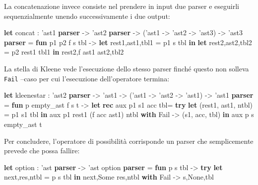 \documentclass[]{article}
\newenvironment{Shaded}{}{}
\newcommand{\DataTypeTok}[1]{\textcolor[rgb]{0.56,0.13,0.00}{#1}}
\newcommand{\KeywordTok}[1]{\textcolor[rgb]{0.00,0.44,0.13}{\textbf{#1}}}
\newcommand{\NormalTok}[1]{#1}
\begin{document}
La concatenazione invece consiste nel prendere in input due parser e
eseguirli sequenzialmente unendo successivamente i due output:

\begin{Shaded}
\begin{Highlighting}[]
\KeywordTok{let}\NormalTok{ concat : }
\NormalTok{'ast1 }\KeywordTok{parser}\NormalTok{ -> 'ast2 }\KeywordTok{parser}\NormalTok{ -> ('ast1 -> 'ast2 -> 'ast3) -> 'ast3 }\KeywordTok{parser}\NormalTok{ = }
\KeywordTok{fun}\NormalTok{ p1 p2 f s tbl ->}
  \KeywordTok{let}\NormalTok{ rest1,ast1,tbl1 = p1 s tbl }\KeywordTok{in}
  \KeywordTok{let}\NormalTok{ rest2,ast2,tbl2 = p2 rest1 tbl1 }\KeywordTok{in}
\NormalTok{  rest2,f ast1 ast2,tbl2}
\end{Highlighting}
\end{Shaded}

La stella di Kleene vede l'esecuzione dello stesso parser finché questo
non solleva \texttt{Fail} --caso per cui l'esecuzione dell'operatore
termina:

\begin{Shaded}
\begin{Highlighting}[]
\KeywordTok{let}\NormalTok{ kleenestar : }
\NormalTok{'ast2 }\KeywordTok{parser}\NormalTok{ -> 'ast1 -> ('ast1 -> 'ast2 -> 'ast1) -> 'ast1 }\KeywordTok{parser}\NormalTok{ =}
 \KeywordTok{fun}\NormalTok{ p empty_ast f s t ->}
  \KeywordTok{let} \KeywordTok{rec}\NormalTok{ aux p1 s1 acc tbl=}
  \KeywordTok{try}
   \KeywordTok{let}\NormalTok{ (rest1, ast1, ntbl) = p1 s1 tbl }\KeywordTok{in}
\NormalTok{   aux p1 rest1 (f acc ast1) ntbl}
  \KeywordTok{with}\NormalTok{ Fail -> (s1, acc, tbl)}
  \KeywordTok{in}\NormalTok{ aux p s empty_ast t}
\end{Highlighting}
\end{Shaded}

Per concludere, l'operatore di possibilità corrisponde un parser che
semplicemente prevede che possa fallire:

\begin{Shaded}
\begin{Highlighting}[]
\KeywordTok{let} \DataTypeTok{option}\NormalTok{ : 'ast }\KeywordTok{parser}\NormalTok{ -> 'ast }\DataTypeTok{option} \KeywordTok{parser}\NormalTok{ =}
 \KeywordTok{fun}\NormalTok{ p s tbl -> }\KeywordTok{try}
  \KeywordTok{let}\NormalTok{ next,res,ntbl = p s tbl }\KeywordTok{in}\NormalTok{ next,}\DataTypeTok{Some}\NormalTok{ res,ntbl}
 \KeywordTok{with}\NormalTok{ Fail -> s,}\DataTypeTok{None}\NormalTok{,tbl}
\end{Highlighting}
\end{Shaded}
\end{document}
